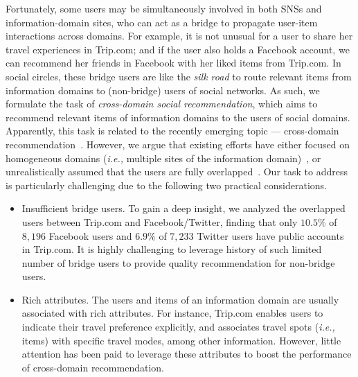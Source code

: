 \documentclass[sigconf]{acmart}
\begin{document}
Fortunately, some users may be simultaneously involved in both SNSs and information-domain sites, who can act as a bridge to propagate user-item interactions across domains.
For example, it is not unusual for a user to share her travel experiences in Trip.com; and if the user also holds a Facebook account, we can recommend her friends in Facebook with her liked items from Trip.com.
In social circles, these bridge users are like the \emph{silk road} to route relevant items from information domains to  (non-bridge) users of social networks.
As such, we formulate the task of \textit{cross-domain social recommendation}, which aims to recommend relevant items of information domains to the users of social domains.
Apparently, this task is related to the recently emerging topic --- cross-domain recommendation~\cite{DBLP:journals/tkde/JiangCCW0Y15}.
However, we argue that existing efforts have either focused on homogeneous domains (\textit{i.e.,} multiple sites of the information domain)~\cite{DBLP:conf/www/ElkahkySH15}, or unrealistically assumed that the users are fully overlapped~\cite{DBLP:journals/tkde/JiangCCW0Y15,wang2017unifying}. Our task to address is particularly challenging due to the following two practical considerations.


\begin{itemize}[leftmargin=*]
\item Insufficient bridge users. To gain a deep insight, we analyzed the overlapped users between Trip.com and Facebook/Twitter, finding that only $10.5\%$ of $8,196$ Facebook users and $6.9\%$ of $7,233$ Twitter users have public accounts in Trip.com. It is highly challenging to leverage history of such limited number of bridge users to provide quality recommendation for non-bridge users.\item Rich attributes. The users and items of an information domain are usually associated with rich attributes. For instance, Trip.com enables users to indicate their travel preference explicitly, and associates travel spots (\textit{i.e.,} items) with specific travel modes, among other information. However, little attention has been paid to leverage these attributes to boost the performance of cross-domain recommendation.
\end{itemize} \vspace{-5pt}
\end{document}
